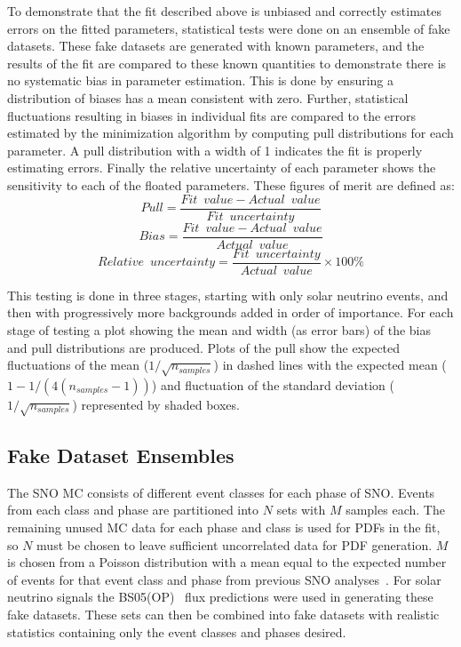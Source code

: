 To demonstrate that the fit described above is unbiased and correctly estimates errors on the fitted parameters, statistical tests were done on an ensemble of fake datasets.
These fake datasets are generated with known parameters, and the results of the fit are compared to these known quantities to demonstrate there is no systematic bias in parameter estimation.
This is done by ensuring a distribution of biases has a mean consistent with zero.
Further, statistical fluctuations resulting in biases in individual fits are compared to the errors estimated by the minimization algorithm by computing pull distributions for each parameter. 
A pull distribution with a width of 1 indicates the fit is properly estimating errors.
Finally the relative uncertainty of each parameter shows the sensitivity to each of the floated parameters.
These figures of merit are defined as:
\begin{equation}
Pull = \frac{Fit\,\,\,value - Actual\,\,\,value}{Fit\,\,\,uncertainty}
\end{equation}
\begin{equation}
Bias = \frac{Fit\,\,\,value - Actual\,\,\,value}{Actual\,\,\,value}
\end{equation}
\begin{equation}
Relative\,\,\,uncertainty = \frac{Fit\,\,\,uncertainty}{Actual\,\,\,value} \times 100\%
\end{equation}

This testing is done in three stages, starting with only solar neutrino events, and then with progressively more backgrounds added in order of importance.
For each stage of testing a plot showing the mean and width (as error bars) of the bias and pull distributions are produced.
Plots of the pull show the expected fluctuations of the mean ($1/\sqrt{n_{samples}}$) in dashed lines with the expected mean ($1 - 1/(4(n_{samples}-1))$) and fluctuation of the standard deviation ($1/\sqrt{n_{samples}}$) represented by shaded boxes.

\subsection{Fake Dataset Ensembles}

The SNO MC consists of different event classes for each phase of SNO.
Events from each class and phase are partitioned into $N$ sets with $M$ samples each. 
The remaining unused MC data for each phase and class is used for PDFs in the fit, so $N$ must be chosen to leave sufficient uncorrelated data for PDF generation.
$M$ is chosen from a Poisson distribution with a mean equal to the expected number of events for that event class and phase from previous SNO analyses~\cite{leta,ncd,3phase}.
For solar neutrino signals the BS05(OP)~\cite{bs05op} flux predictions were used in generating these fake datasets.
These sets can then be combined into fake datasets with realistic statistics containing only the event classes and phases desired.

